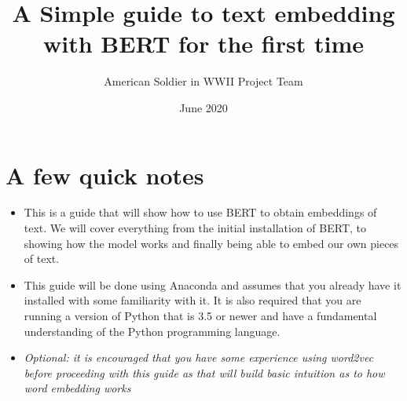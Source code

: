\documentclass{article}
\title{A Simple guide to text embedding with BERT for the first time}
\author{American Soldier in WWII Project Team}
\date{June 2020}
\begin{document}
\maketitle

\section*{A few quick notes} 
\begin{itemize}
    \item This is a guide that will show how to use BERT to obtain embeddings of text.  We will cover everything from the initial installation of BERT, to showing how the model works and finally being able to embed our own pieces of text.
    \item This guide will be done using Anaconda and assumes that you already have it installed with some familiarity with it. It is also required that you are running a version of Python that is 3.5 or newer and have a fundamental understanding of the Python programming language.
    \item[]
    \textit{Optional: it is encouraged that you have some experience using word2vec before proceeding with this guide as that will build basic intuition as to how word embedding works}
\end{itemize}
\end{document}
